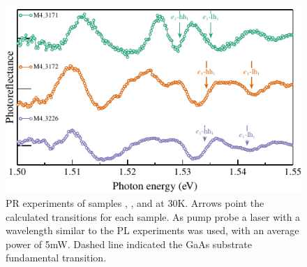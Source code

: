 \begin{figure}[ht!]
	\centering
	\includegraphics[width=\textwidth]{../figures/chapter-3/pr-plots/build-ruco/pr-set1.pdf}
	\caption{ 
		PR experiments of samples , , and  at 30K. Arrows point the calculated transitions for each sample. As pump probe a laser with a wavelength similar to the PL experiments was used, with an average power of 5mW. Dashed line indicated the GaAs substrate fundamental transition. 
		}
	\label{fig:chapter-3-PR-PLOT-SET1}
\end{figure}

